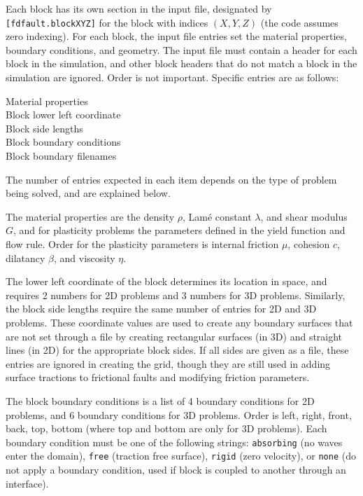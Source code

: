 \documentclass[12pt]{article}   	%
\begin{document}
Each block has its own section in the input file, designated by {\tt [fdfault.blockXYZ]} for the block with indices $(X,Y,Z)$ (the code assumes zero indexing). For each block, the input file entries set the material properties, boundary conditions, and geometry. The input file must contain a header for each block in the simulation, and other block headers that do not match a block in the simulation are ignored. Order is not important. Specific entries are as follows:

\vspace{0.1in}
\indent Material properties \\
\indent Block lower left coordinate \\
\indent Block side lengths \\
\indent Block boundary conditions \\
\indent Block boundary filenames

\vspace{0.1in}
\noindent The number of entries expected in each item depends on the type of problem being solved, and are explained below.

The material properties are the density $\rho$, Lam\'{e} constant $\lambda$, and shear modulus $G$, and for plasticity problems the parameters defined in the yield function and flow rule. Order for the plasticity parameters is internal friction $\mu$, cohesion $c$, dilatancy $\beta$, and viscosity $\eta$.

The lower left coordinate of the block determines its location in space, and requires 2 numbers for 2D problems and 3 numbers for 3D problems. Similarly, the block side lengths require the same number of entries for 2D and 3D problems. These coordinate values are used to create any boundary surfaces that are not set through a file by creating rectangular surfaces (in 3D) and straight lines (in 2D) for the appropriate block sides. If all sides are given as a file, these entries are ignored in creating the grid, though they are still used in adding surface tractions to frictional faults and modifying friction parameters.

The block boundary conditions is a list of 4 boundary conditions for 2D problems, and 6 boundary conditions for 3D problems. Order is left, right, front, back, top, bottom (where top and bottom are only for 3D problems). Each boundary condition must be one of the following strings: {\tt absorbing} (no waves enter the domain), {\tt free} (traction free surface), {\tt rigid} (zero velocity), or {\tt none} (do not apply a boundary condition, used if block is coupled to another through an interface).
\end{document}
